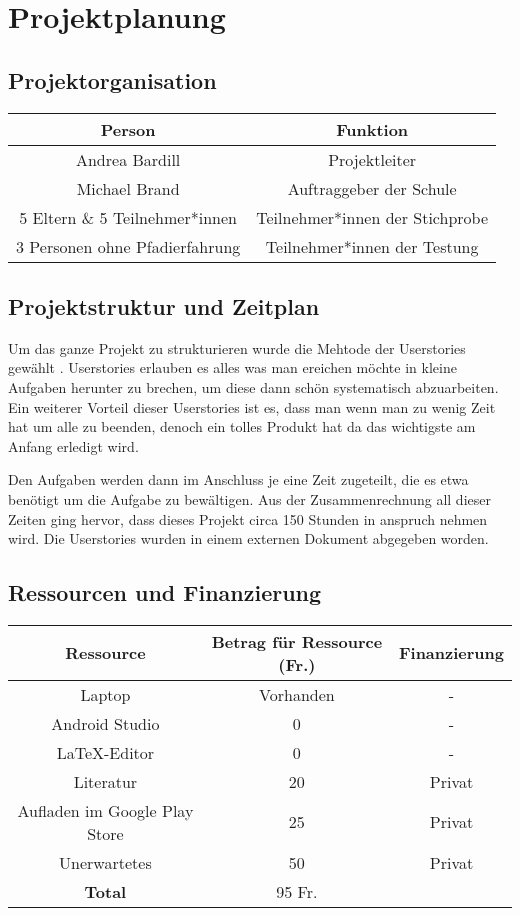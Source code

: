 
\chapter{Projektplanung}

\section{Projektorganisation}
\begin{center}
\begin{tabular}{c|c}
    \textbf{Person} & \textbf{Funktion} \\ \hline
    Andrea Bardill & Projektleiter \\
    Michael Brand & Auftraggeber der Schule \\
    5 Eltern \& 5 Teilnehmer*innen & Teilnehmer*innen der Stichprobe \\
    3 Personen ohne Pfadierfahrung & Teilnehmer*innen der Testung
\end{tabular}
\end{center}

\section{Projektstruktur und Zeitplan}
Um das ganze Projekt zu strukturieren wurde die Mehtode der Userstories gewählt \cite{userstories}. Userstories erlauben es alles was man ereichen möchte in kleine Aufgaben herunter zu brechen, um diese dann schön systematisch abzuarbeiten. Ein weiterer Vorteil dieser Userstories ist es, dass man wenn man zu wenig Zeit hat um alle zu beenden, denoch ein tolles Produkt hat da das wichtigste am Anfang erledigt wird. \par Den Aufgaben werden dann im Anschluss je eine Zeit zugeteilt, die es etwa benötigt um die Aufgabe zu bewältigen. Aus der Zusammenrechnung all dieser Zeiten ging hervor, dass dieses Projekt circa 150 Stunden in anspruch nehmen wird. Die Userstories wurden in einem externen Dokument abgegeben worden.

\section{Ressourcen und Finanzierung}

\begin{center}
\begin{tabular}{c|c|c}
    \textbf{Ressource} & \textbf{Betrag für Ressource (Fr.)} & \textbf{Finanzierung} \\ \hline
    Laptop & Vorhanden & - \\
    Android Studio & 0 & - \\
    \LaTeX -Editor & 0 & - \\
    Literatur & 20 & Privat\\
    Aufladen im Google Play Store & 25 & Privat \\
    Unerwartetes & 50 & Privat \\ \hline
    \textbf{Total} & 95 Fr. & 
\end{tabular}
\end{center}

